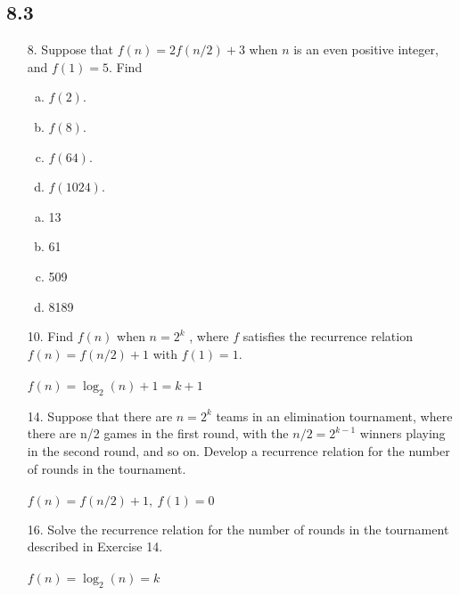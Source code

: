 \subsection{8.3}
\begin{itemize}
    \item[8.]  Suppose that $f(n) = 2f(n/2) + 3$ when $n$ is an even positive integer, and $f(1) = 5$. Find
          \begin{enumerate}[a.]
              \item $f (2)$.
              \item $f (8)$.
              \item $f (64)$.
              \item $f (1024)$.
          \end{enumerate}
          \answer
          \begin{enumerate}[a.]
              \item 13
              \item 61
              \item 509
              \item 8189
          \end{enumerate}

    \item[10.] Find $f(n)$ when $n = 2^k$
          , where $f$ satisfies the recurrence
          relation $f(n) = f (n/2) + 1$ with $f(1) = 1$. \\
          \answer \\
          $f(n) = \log_2(n) + 1 = k+1$

    \item[14.] Suppose that there are $n = 2^k$ teams in an elimination
          tournament, where there are n/2 games in the first round,
          with the $n/2 = 2^{k-1}$ winners playing in the second round,
          and so on. Develop a recurrence relation for the number
          of rounds in the tournament. \\
          \answer \\
          $f(n) = f(n/2) + 1, \ f(1) =0$

    \item[16.] Solve the recurrence relation for the number of rounds in
          the tournament described in Exercise 14. \\
          \answer \\
          $f(n) = \log_2(n) = k$




\end{itemize}